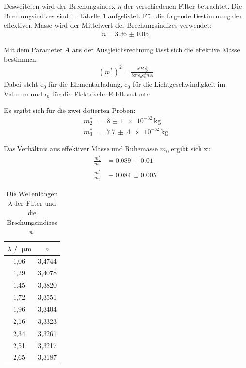Desweiteren wird der Brechungsindex $n$ der verschiedenen Filter betrachtet. Die Brechungsindizes sind in Tabelle \ref{tab:n} aufgelistet. Für die folgende Bestimmung der effektiven Masse wird der Mittelwert
der Brechungsindizes verwendet:
\begin{align}
  n = \SI{3.36(5)}{}
\end{align}

Mit dem Parameter $A$ aus der Ausgleichsrechnung lässt sich die effektive Masse bestimmen:
\begin{align}
  (m^*)^2 = \frac{NB\mathrm{e}_0^3}{8\pi^2\epsilon_0\mathrm{c}_0^3nA}
\end{align}
Dabei steht $\mathrm{e}_0$ für die Elementarladung, $\mathrm{c}_0$ für die Lichtgeschwindigkeit im Vakuum und
$\epsilon_0$ für die Elektrische Feldkonstante.

Es ergibt sich für die zwei dotierten Proben:
\begin{align}
  m^*_2 &= \SI{8(1)e-32}{\kilogram}\\
  m^*_3 &= \SI{7.7(4)e-32}{\kilogram}
\end{align}

Das Verhältnis aus effektiver Masse und Ruhemasse $m_0$ ergibt sich zu
\begin{align}
  \frac{m^*_2}{m_0} &= \SI{0.089(10)}{}\\
  \frac{m^*_3}{m_0} &= \SI{0.084(5)}{} 
\end{align}

\begin{table}
  \centering
  \begin{tabular}{c c}
    \toprule
    $\lambda$ / $\SI{}{\micro\metre}$ & $n$\\
    \midrule
        1,06  & 3,4744\\  
        1,29  & 3,4078\\  
        1,45  & 3,3820\\  
        1,72  & 3,3551\\  
        1,96  & 3,3404\\  
        2,16  & 3,3323\\  
        2,34  & 3,3261\\  
        2,51  & 3,3217\\  
        2,65  & 3,3187\\  
    \bottomrule
  \end{tabular}
  \caption{Die Wellenlängen $\lambda$ der Filter und die
  Brechungsindizes $n$.}
  \label{tab:n}
\end{table}

